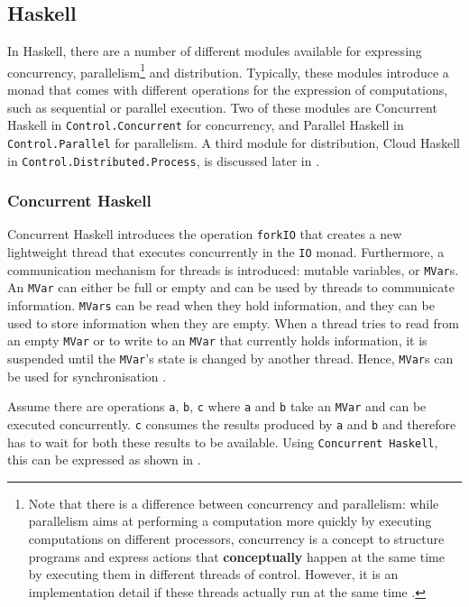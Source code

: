 \clearpage
\subsection{Haskell}
In \textsf{Haskell}, there are a number of different modules available for expressing concurrency, parallelism\footnote{Note that there is a difference between concurrency and parallelism: while parallelism aims at performing a computation more quickly by executing computations on different processors, concurrency is a concept to structure programs and express actions that \textbf{conceptually} happen at the same time by executing them in different threads of control. However, it is an implementation detail if these threads actually run at the same time \cite{Marlow}.} and distribution. Typically, these modules introduce a monad that comes with different operations for the expression of computations, such as sequential or parallel execution. Two of these modules are \textsf{Concurrent Haskell} in \texttt{Control.Concurrent} for concurrency, and \textsf{Parallel Haskell} in \texttt{Control.Parallel} for parallelism. A third module for distribution, \textsf{Cloud Haskell} in \texttt{Control.Distributed.Process}, is discussed later in .

\subsubsection{Concurrent Haskell}
\textsf{Concurrent Haskell} introduces the operation \texttt{forkIO} that creates a new lightweight thread that executes concurrently in the \texttt{IO} monad. Furthermore, a communication mechanism for threads is introduced: mutable variables, or \texttt{MVar}s. An \texttt{MVar} can either be full or empty and can be used by threads to communicate information. \texttt{MVars} can be read when they hold information, and they can be used to store information when they are empty. When a thread tries to read from an empty \texttt{MVar} or to write to an \texttt{MVar} that currently holds information, it is suspended until the \texttt{MVar}'s state is changed by another thread. Hence, \texttt{MVar}s can be used for synchronisation \cite{Marlow}.

Assume there are operations \texttt{a}, \texttt{b}, \texttt{c} where \texttt{a} and \texttt{b} take an \texttt{MVar} and can be executed concurrently. \texttt{c} consumes the results produced by \texttt{a} and \texttt{b} and therefore has to wait for both these results to be available. Using \texttt{Concurrent Haskell}, this can be expressed as shown in .

